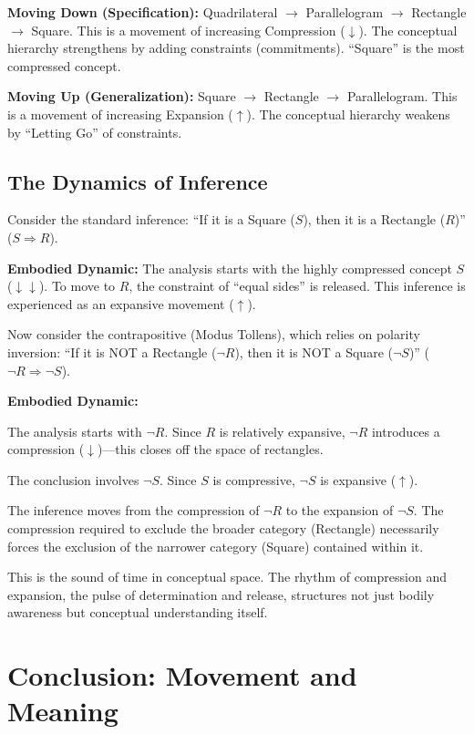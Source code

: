 \documentclass[12pt]{book}
\begin{document}
\textbf{Moving Down (Specification):} Quadrilateral $\rightarrow$ Parallelogram $\rightarrow$ Rectangle $\rightarrow$ Square. This is a movement of increasing Compression (\(\downarrow\)). The conceptual hierarchy strengthens by adding constraints (commitments). ``Square'' is the most compressed concept.

\textbf{Moving Up (Generalization):} Square $\rightarrow$ Rectangle $\rightarrow$ Parallelogram. This is a movement of increasing Expansion (\(\uparrow\)). The conceptual hierarchy weakens by ``Letting Go'' of constraints.

\subsection*{The Dynamics of Inference}\label{the-dynamics-of-inference}

Consider the standard inference: ``If it is a Square (\(S\)), then it is a Rectangle (\(R\))'' (\(S \Rightarrow R\)).

\textbf{Embodied Dynamic:} The analysis starts with the highly compressed concept \(S\) (\(\downarrow\downarrow\)). To move to \(R\), the constraint of ``equal sides'' is released. This inference is experienced as an expansive movement (\(\uparrow\)).

Now consider the contrapositive (Modus Tollens), which relies on polarity inversion: ``If it is NOT a Rectangle (\(\neg R\)), then it is NOT a Square (\(\neg S\))'' (\(\neg R \Rightarrow \neg S\)).

\textbf{Embodied Dynamic:}

The analysis starts with \(\neg R\). Since \(R\) is relatively expansive, \(\neg R\) introduces a compression (\(\downarrow\))---this closes off the space of rectangles.

The conclusion involves \(\neg S\). Since \(S\) is compressive, \(\neg S\) is expansive (\(\uparrow\)).

The inference moves from the compression of \(\neg R\) to the expansion of \(\neg S\). The compression required to exclude the broader category (Rectangle) necessarily forces the exclusion of the narrower category (Square) contained within it.

This is the sound of time in conceptual space. The rhythm of compression and expansion, the pulse of determination and release, structures not just bodily awareness but conceptual understanding itself.

\section{Conclusion: Movement and Meaning}\label{conclusion-movement-and-meaning}
\end{document}
